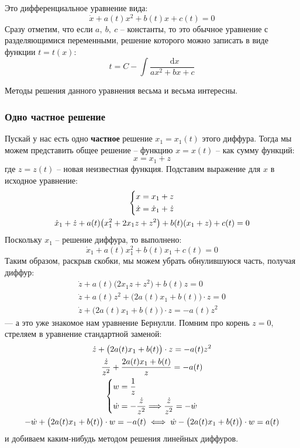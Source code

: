 \documentclass[a4paper,12pt]{article}
\renewcommand*\d{\mathop{}\!\mathrm{d}}
\newcommand{\dw}{\dot{w}}
\newcommand{\dx}{\dot{x}}
\newcommand{\dz}{\dot{z}}
\newcommand{\ds}{\displaystyle}
\begin{document}
Это дифференциальное уравнение вида:
\[\dx + a(t)x^2 + b(t)x + c(t) = 0\]
Сразу отметим, что если $a,\ b,\ c$ -- константы, то это обычное уравнение с разделяющимися переменными, решение которого можно записать в виде функции $t = t(x)$:
\[t = C - \ds\int\dfrac{\d x}{ax^2 + bx + c}\]

Методы решения данного уравнения весьма и весьма интересны.

\subsubsection{Одно частное решение}

Пускай у нас есть одно \textbf{частное} решение $x_1 = x_1(t)$ этого диффура. Тогда мы можем представить общее решение -- функцию $x = x(t)$ -- как сумму функций:
\[x = x_1 + z\] где $z = z(t)$ -- новая неизвестная функция. Подставим выражение для $x$ в исходное уравнение:
\begin{gather*}
	\left\{\begin{gathered}
	x = x_1 + z\hfill\\
	\dx = \dx_1 + \dz\hfill
	\end{gathered}\right.\\
	\dx_1 + \dz + a(t)\big(x_1^2  + 2x_1z + z^2\big) + b(t)(x_1 + z) + c(t) = 0\\
\end{gather*}
Поскольку $x_1$ -- решение диффура, то выполнено:
\[\dx_1 + a(t)x_1^2 + b(t)x_1 + c(t) = 0\]
Таким образом, раскрыв скобки, мы можем убрать обнулившуюся часть, получая диффур:
\begin{gather*}
\dz + a(t)\big(2x_1z + z^2\big) + b(t)z = 0\\
\dz + a(t)z^2 + \big(2a(t)x_1 + b(t)\big) \cdot z = 0\\
\dz + \big(2a(t)x_1 + b(t)\big) \cdot z = -a(t)z^2
\end{gather*}
--- а это уже знакомое нам уравнение Бернулли. Помним про корень $z = 0$, стреляем в уравнение стандартной заменой:
\begin{gather*}
\dz + \big(2a(t)x_1 + b(t)\big) \cdot z = -a(t)z^2\\
\dfrac{\dz}{z^2} + \dfrac{2a(t)x_1 + b(t)}{z} = -a(t)\\
\left\{\begin{gathered}
w = \dfrac{1}{z}\hfill\\
\dw = -\dfrac{\dz}{z^2} \Longrightarrow \dfrac{\dz}{z^2} = -\dw\hfill
\end{gathered}\right.\\
-\dw + \big(2a(t)x_1 + b(t)\big) \cdot w = -a(t) \iff \dw - \big(2a(t)x_1 + b(t)\big) \cdot w = a(t)
\end{gather*}
и добиваем каким-нибудь методом решения линейных диффуров.
\end{document}

